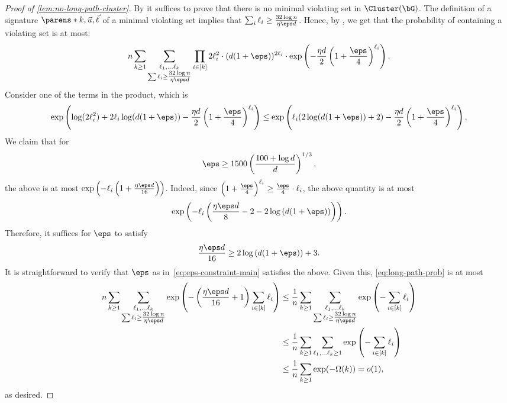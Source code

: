 \documentclass[11pt,letterpaper]{article}
\begin{document}
    \begin{proof}[Proof of \cref{lem:no-long-path-cluster}]
        By  it suffices to prove that there is no minimal violating set in $\Cluster(\bG)$.
        The definition of a signature $\parens*{k,\vec{u},\vec{\ell}}$ of a minimal violating set implies that $\sum_i\ell_i \ge \frac{32\log n}{\eta\eps d}$.
        Hence, by , we get that the probability of containing a violating set is at most:
        \begin{align}\label{eq:long-path-prob}
            n \sum_{k \ge 1} \sum_{\substack{\ell_1, \ldots \ell_k \\ \sum \ell_i \ge \tfrac{32\log n}{\eta\eps d}}} \prod_{i \in [k]} 2\ell_i^2 \cdot (d(1+\eps))^{2\ell_i} \cdot \exp\left(-\frac{\eta d}{2}\left(1+\frac{\eps}{4}\right)^{\ell_i}\right).
        \end{align}
        Consider one of the terms in the product, which is
        \[
            \exp\left(\log(2\ell_i^2) + 2\ell_i \log (d(1+\eps)) - \frac{\eta d}{2}\left(1+\frac{\eps}{4}\right)^{\ell_i}\right) \le \exp\left(\ell_i (2\log (d(1+\eps))+2) - \frac{\eta d}{2}\left(1+\frac{\eps}{4}\right)^{\ell_i}\right).
        \]
        We claim that for
        \begin{equation}
            \label{eq:eps-constraint-main}
            \eps \ge 1500 \left( \frac{100+\log d}{d} \right)^{1/3},
        \end{equation}
        the above is at most $\exp \left( - \ell_i \left( 1 + \frac{\eta \eps d}{16} \right) \right)$.
        Indeed, since $\left(1+\frac{\eps}{4}\right)^{\ell_i} \ge \frac{\eps}{4} \cdot \ell_i$, the above quantity is at most
        \[
            \exp\left( - \ell_i \left( \frac{\eta \eps d}{8} - 2 - 2 \log\left( d (1+\eps) \right) \right) \right).
        \]
        Therefore, it suffices for $\eps$ to satisfy
        \[
            \frac{\eta \eps d}{16} \ge 2 \log \left( d (1+\eps) \right) + 3.
        \]
        It is straightforward to verify that $\eps$ as in~\eqref{eq:eps-constraint-main} satisfies the above.
        Given this, \eqref{eq:long-path-prob} is at most
        \begin{align*}
            n \sum_{k \ge 1} \sum_{\substack{\ell_1, \ldots \ell_k \\ \sum \ell_i \ge \tfrac{32\log n}{\eta\eps d}}} \exp\left(-\left(\frac{\eta\eps d}{16} + 1\right)\sum_{i \in [k]} \ell_i\right) & 
            \le \frac{1}{n} \sum_{k \ge 1} \sum_{\substack{\ell_1, \ldots \ell_k \\ \sum \ell_i \ge \tfrac{32\log n}{\eta\eps d}}} \exp\left(-\sum_{i \in [k]} \ell_i\right) \\
            &\le \frac{1}{n} \sum_{k \ge 1} \sum_{\ell_1, \ldots \ell_k \ge 1} \exp\left(-\sum_{i \in [k]} \ell_i\right) \\
            &\le \frac{1}{n} \sum_{k \ge 1} \exp(-\Omega(k)) = o(1),
        \end{align*}
        as desired.
    \end{proof}
\end{document}
